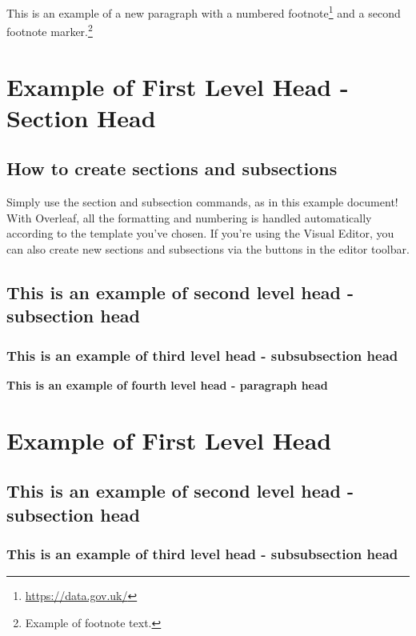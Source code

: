 \documentclass[12pt,a4paper]{article}
\newcommand{\subsubsubsection}[1]{%
  \vspace{\baselineskip}%
  \noindent\textbf{#1\\}\quad%
}
\begin{document}
This is an example of a new paragraph with a numbered footnote\footnote{\url{https://data.gov.uk/}} and a second footnote marker.\footnote{Example of footnote text.}


\section{Example of First Level Head - Section Head}\label{sec2}

\lipsum[4]

\lipsum[4]


\subsection{How to create sections and subsections}
Simply use the section and subsection commands, as in this example document! With Overleaf, all the formatting and numbering is handled automatically according to the template you've chosen. If you're using the Visual Editor, you can also create new sections and subsections via the buttons in the editor toolbar.

\subsection{This is an example of second level head - subsection head}\label{subsec1}
\lipsum[5]

\subsubsection{This is an example of third level head - subsubsection head}\label{subsubsec1}
\lipsum[6]

\subsubsubsection{This is an example of fourth level head - paragraph head}
\lipsum[7]


\section{Example of First Level Head}\label{sec3}

\subsection{This is an example of second level head - subsection head}\label{subsec2}

\subsubsection{This is an example of third level head - subsubsection head}\label{subsubsec2}
\lipsum[8]
\end{document}
